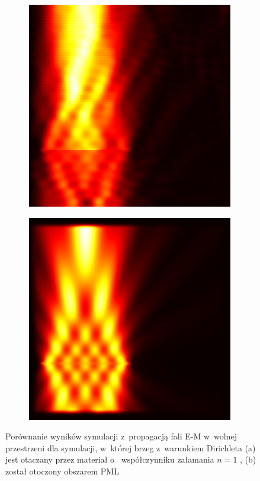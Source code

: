 \begin{figure}[htb]
	\centering
	\begin{subfigure}{0.45\textwidth}
		\includegraphics[width=\textwidth]{images/wstep/SUM-nopml-energy.png}
		\caption{}
		\label{fig:wstep-pml-bad}
	\end{subfigure}
	\begin{subfigure}{0.45\textwidth}
		\includegraphics[width=\textwidth]{images/wstep/SUM-pml-energy.png}
		\caption{}
	\end{subfigure}
	\caption{Porównanie wyników symulacji z~propagacją fali E-M w~wolnej przestrzeni dla symulacji, w~której brzeg z~warunkiem Dirichleta (a) jest otaczany przez materiał o~ współczynniku załamania $n=1$ , (b) został otoczony obszarem PML}
\end{figure}

